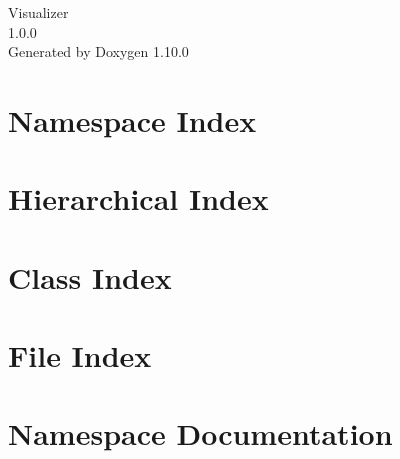 \documentclass[twoside]{book}
\newcommand{\+}{\discretionary{\mbox{\scriptsize$\hookleftarrow$}}{}{}}
\newcommand{\clearemptydoublepage}{%
    \newpage{\pagestyle{empty}\cleardoublepage}%
  }
\begin{document}
  \raggedbottom
    \hypersetup{pageanchor=false,
                bookmarksnumbered=true,
                pdfencoding=unicode
               }
  \begin{titlepage}
  \vspace*{7cm}
  \begin{center}%
  {\Large Visualizer}\\
  [1ex]\large 1.\+0.\+0 \\
  \vspace*{1cm}
  {\large Generated by Doxygen 1.10.0}\\
  \end{center}
  \end{titlepage}
  \clearemptydoublepage
  \tableofcontents
  \clearemptydoublepage
  \hypersetup{pageanchor=true}

\chapter{Namespace Index}

\chapter{Hierarchical Index}

\chapter{Class Index}

\chapter{File Index}

\chapter{Namespace Documentation}






\end{document}
